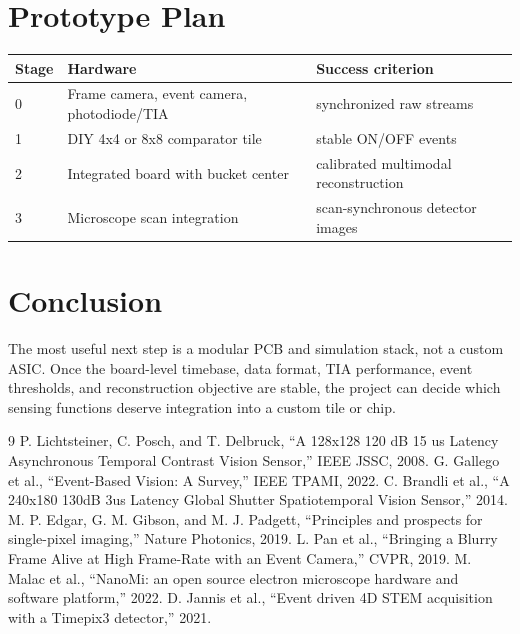 \documentclass[11pt]{article}
\begin{document}
\section{Prototype Plan}

\begin{tabular}{lll}
\toprule
Stage & Hardware & Success criterion \\
\midrule
0 & Frame camera, event camera, photodiode/TIA & synchronized raw streams \\
1 & DIY 4x4 or 8x8 comparator tile & stable ON/OFF events \\
2 & Integrated board with bucket center & calibrated multimodal reconstruction \\
3 & Microscope scan integration & scan-synchronous detector images \\
\bottomrule
\end{tabular}

\section{Conclusion}

The most useful next step is a modular PCB and simulation stack, not a custom ASIC. Once the board-level timebase, data format, TIA performance, event thresholds, and reconstruction objective are stable, the project can decide which sensing functions deserve integration into a custom tile or chip.

\begin{thebibliography}{9}
 P. Lichtsteiner, C. Posch, and T. Delbruck, ``A 128x128 120 dB 15 us Latency Asynchronous Temporal Contrast Vision Sensor,'' IEEE JSSC, 2008.
 G. Gallego et al., ``Event-Based Vision: A Survey,'' IEEE TPAMI, 2022.
 C. Brandli et al., ``A 240x180 130dB 3us Latency Global Shutter Spatiotemporal Vision Sensor,'' 2014.
 M. P. Edgar, G. M. Gibson, and M. J. Padgett, ``Principles and prospects for single-pixel imaging,'' Nature Photonics, 2019.
 L. Pan et al., ``Bringing a Blurry Frame Alive at High Frame-Rate with an Event Camera,'' CVPR, 2019.
 M. Malac et al., ``NanoMi: an open source electron microscope hardware and software platform,'' 2022.
 D. Jannis et al., ``Event driven 4D STEM acquisition with a Timepix3 detector,'' 2021.
\end{thebibliography}
\end{document}
